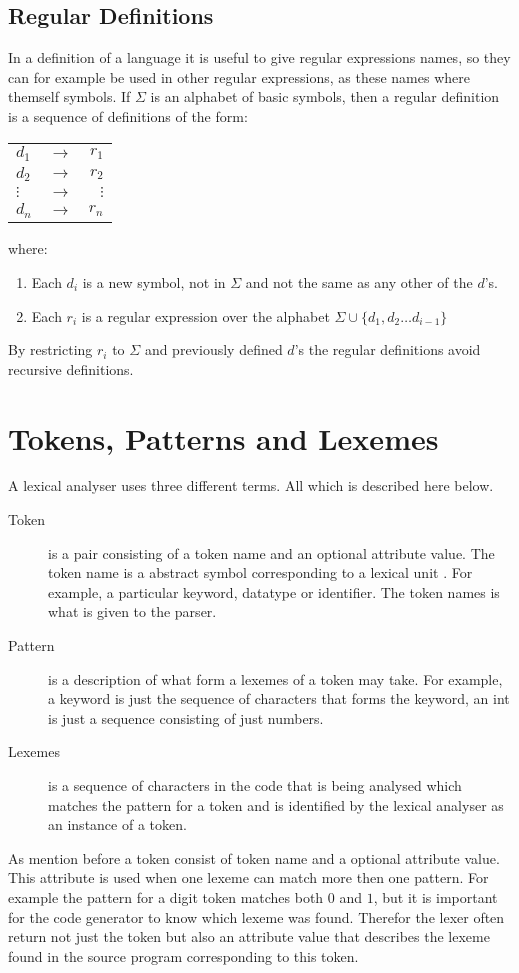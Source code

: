 \subsection{Regular Definitions}
In a definition of a language it is useful to give regular expressions names, 
so they can for example be used in other regular expressions, as these names 
where themself symbols. If $\Sigma$ is an alphabet of basic symbols, then a 
regular definition is a sequence of definitions of the form:
\begin{center}
\begin{tabular}{l c r}
$d_1$ & $\to$ & $r_1$\\
$d_2$ & $\to$ & $r_2$\\
$\vdots$ & $\to$ & $\vdots$\\
$d_n$ & $\to$ & $r_n$\\

\end{tabular}
\end{center}
where:
\begin{enumerate}
\item Each $d_i$ is a new symbol, not in $\Sigma$ and not the same as any other 
of the $d$'s.
\item Each $r_i$ is a regular expression over the alphabet $\Sigma  \cup \{d_1, 
d_2 \dots d_{i-1}\}$
\end{enumerate}
By restricting $r_i$ to $\Sigma$ and previously defined $d$'s the regular 
definitions avoid recursive definitions.  
\cite{Aho2006}
\section{Tokens, Patterns and Lexemes}
A lexical analyser uses three different terms. All which is described here 
below. 
\begin{description}
  \item[Token]
    is a pair consisting of a token name and an optional attribute value. The 
token name is a abstract symbol corresponding to a lexical unit \cite{Aho2006}. 
For example, a particular keyword, datatype or identifier.  The token names is 
what is given to the parser. 
  \item[Pattern]
    is a description of what form a lexemes of a token may take. \cite{Aho2006} 
For example, a keyword is just the sequence of characters that forms the 
keyword, an int is just a sequence consisting of just numbers. 
  \item[Lexemes]
    is a sequence of characters in the code that is being analysed which 
matches the pattern for a token and is identified by the lexical analyser as an 
instance of a token. \cite{Aho2006}
\end{description}
As mention before a token consist of token name and a optional attribute value. 
This attribute is used when one lexeme can match more then one pattern. \cite
{Aho2006} For example the pattern for a digit token matches both $0$ and $1$, 
but it is important for the code generator to know which lexeme was found. 
Therefor the lexer often return not just the token but also an attribute value 
that describes the lexeme found in the source program corresponding to this 
token. \cite{Aho2006}
